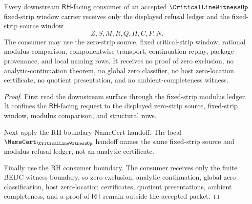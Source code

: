 \begin{theorem}
\label{thm:critical-line-witness-fixed-strip-rh-refusal}
Every downstream $\mathsf{RH}$-facing consumer of an accepted $\CriticalLineWitnessUp$ fixed-strip window carrier receives only the displayed refusal ledger and the fixed-strip source window
$$
Z,S,M,R,Q,H,C,P,N.
$$
The consumer may use the zero-strip source, fixed critical-strip window, rational modulus comparison, componentwise transport, continuation replay, package provenance, and local naming rows. It receives no proof of zero exclusion, no analytic-continuation theorem, no global zero classifier, no host zero-location certificate, no quotient presentation, and no ambient-completeness witness.
\end{theorem}
\begin{proof}
First read the downstream surface through the fixed-strip modulus ledger. It confines the $\mathsf{RH}$-facing request to the displayed zero-strip source, fixed-strip window, modulus comparison, and structural rows.

Next apply the RH-boundary NameCert handoff. The local $\NameCert_{\CriticalLineWitnessUp}$ handoff names the same fixed-strip source and modulus refusal ledger, not an analytic certificate.

Finally use the RH consumer boundary. The consumer receives only the finite BEDC witness boundary, so zero exclusion, analytic continuation, global zero classification, host zero-location certificates, quotient presentations, ambient completeness, and a proof of $\mathsf{RH}$ remain outside the accepted packet.
\end{proof}
